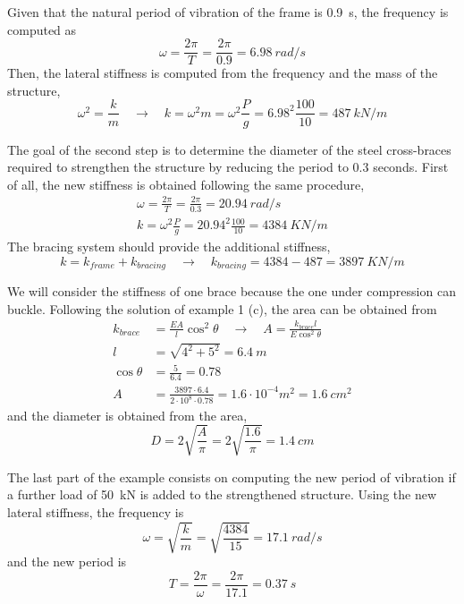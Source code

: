 \begin{Answer}[ref={frames_modification}]
Given that the natural period of vibration of the frame is \SI{0.9}{s}, the frequency is computed as
$$
\omega = \frac{2\pi}{T} = \frac{2\pi}{0.9} = \SI{6.98}{rad/s}
$$
Then, the lateral stiffness is computed from the frequency and the mass of the structure,
$$
\omega^2 = \frac{k}{m} \quad \rightarrow \quad
k = \omega^2m = \omega^2\frac{P}{g} = 6.98^2\frac{100}{10} = \SI{487}{kN/m}
$$

The goal of the second step is to determine the diameter of the steel cross-braces required to strengthen the structure by reducing the period to 0.3 seconds. First of all, the new stiffness is obtained following the same procedure,
\begin{align*}
\omega = \frac{2\pi}{T} = \frac{2\pi}{0.3} = \SI{20.94}{rad/s} \\
k = \omega^2\frac{P}{g} = 20.94^2\frac{100}{10} = \SI{4384}{KN/m}
\end{align*}
The bracing system should provide the additional stiffness,
$$
k = k_{frame} + k_{bracing} \quad \rightarrow \quad k_{bracing} = 4384 - 487 = \SI{3897}{KN/m}
$$

We will consider the stiffness of one brace because the one under compression can buckle. 
Following the solution of example 1 (c), the area can be obtained from
\begin{align*}
k_{brace} &= \frac{EA}{l}\cos^2\theta \quad \rightarrow \quad A = \frac{k_{brace}l}{E\cos^2\theta} \\
l &= \sqrt{4^2 + 5^2} = \SI{6.4}{m} \\
\cos\theta &= \frac{5}{6.4} = 0.78 \\
A &= \frac{3897\cdot 6.4}{2\cdot 10^8\cdot 0.78} = 1.6\cdot 10^{-4} m^2 = \SI{1.6}{cm^2}
\end{align*}
and the diameter is obtained from the area,
$$
D = 2\sqrt{\frac{A}{\pi}} = 2\sqrt{\frac{1.6}{\pi}} = \SI{1.4}{cm}
$$

The last part of the example consists on computing the new period of vibration if a further load of \SI{50}{kN} is added to the strengthened structure. Using the new lateral stiffness, the frequency is
$$
\omega = \sqrt{\frac{k}{m}} = \sqrt{\frac{4384}{15}} = \SI{17.1}{rad/s}
$$
and the new period is
$$
T = \frac{2\pi}{\omega} = \frac{2\pi}{17.1} = \SI{0.37}{s}
$$

\end{Answer}

